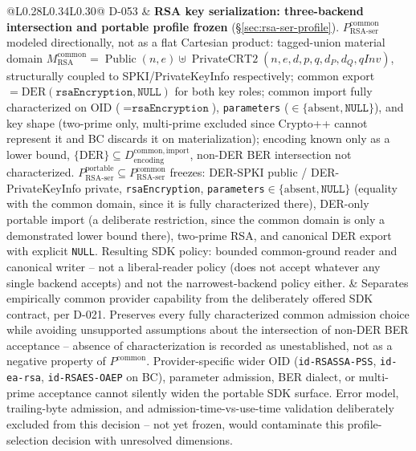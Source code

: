 \documentclass[11pt,a4paper]{article}
\begin{document}
\begin{longtable}{@{}L{0.28\textwidth}L{0.34\textwidth}L{0.30\textwidth}@{}}
D-053 & \textbf{RSA key serialization: three-backend intersection and portable profile frozen} (\S\ref{sec:rsa-ser-profile}). $P_{\mathrm{RSA\text{-}ser}}^{\mathrm{common}}$ modeled directionally, not as a flat Cartesian product: tagged-union material domain $M_{\mathrm{RSA}}^{\mathrm{common}} = \operatorname{Public}(n,e) \uplus \operatorname{PrivateCRT2}(n,e,d,p,q,d_P,d_Q,qInv)$, structurally coupled to SPKI/PrivateKeyInfo respectively; common export $= \mathrm{DER}(\texttt{rsaEncryption},\texttt{NULL})$ for both key roles; common import fully characterized on OID ($=\texttt{rsaEncryption}$), \texttt{parameters} ($\in\{\mathrm{absent},\texttt{NULL}\}$), and key shape (two-prime only, multi-prime excluded since Crypto++ cannot represent it and BC discards it on materialization); encoding known only as a lower bound, $\{\mathrm{DER}\}\subseteq D_{\mathrm{encoding}}^{\mathrm{common,import}}$, non-DER BER intersection not characterized. $P_{\mathrm{RSA\text{-}ser}}^{\mathrm{portable}} \subseteq P_{\mathrm{RSA\text{-}ser}}^{\mathrm{common}}$ freezes: DER-SPKI public / DER-PrivateKeyInfo private, \texttt{rsaEncryption}, \texttt{parameters}$\in\{\mathrm{absent},\texttt{NULL}\}$ (equality with the common domain, since it is fully characterized there), DER-only portable import (a deliberate restriction, since the common domain is only a demonstrated lower bound there), two-prime RSA, and canonical DER export with explicit \texttt{NULL}. Resulting SDK policy: bounded common-ground reader and canonical writer -- not a liberal-reader policy (does not accept whatever any single backend accepts) and not the narrowest-backend policy either. & Separates empirically common provider capability from the deliberately offered SDK contract, per D-021. Preserves every fully characterized common admission choice while avoiding unsupported assumptions about the intersection of non-DER BER acceptance -- absence of characterization is recorded as unestablished, not as a negative property of $P^{\mathrm{common}}$. Provider-specific wider OID (\texttt{id-RSASSA-PSS}, \texttt{id-ea-rsa}, \texttt{id-RSAES-OAEP} on BC), parameter admission, BER dialect, or multi-prime acceptance cannot silently widen the portable SDK surface. Error model, trailing-byte admission, and admission-time-vs-use-time validation deliberately excluded from this decision -- not yet frozen, would contaminate this profile-selection decision with unresolved dimensions.\\

\end{longtable}
\end{document}
